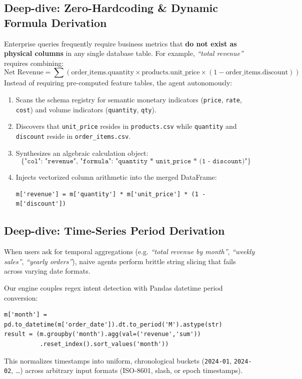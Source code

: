 \documentclass[11pt,a4paper]{article}
\begin{document}
\subsection{Deep-dive: Zero-Hardcoding \& Dynamic Formula Derivation}
Enterprise queries frequently require business metrics that \textbf{do not exist as physical columns} in any single database table. For example, \emph{``total revenue''} requires combining:
$$\text{Net Revenue} = \sum \left( \text{order\_items.quantity} \times \text{products.unit\_price} \times (1 - \text{order\_items.discount}) \right)$$
Instead of requiring pre-computed feature tables, the agent autonomously:
\begin{enumerate}[leftmargin=0.8cm]
\item Scans the schema registry for semantic monetary indicators (\texttt{price}, \texttt{rate}, \texttt{cost}) and volume indicators (\texttt{quantity}, \texttt{qty}).
\item Discovers that \texttt{unit\_price} resides in \texttt{products.csv} while \texttt{quantity} and \texttt{discount} reside in \texttt{order\_items.csv}.
\item Synthesizes an algebraic calculation object:
$$\texttt{\{"col": "revenue", "formula": "quantity * unit\_price * (1 - discount)"\}}$$
\item Injects vectorized column arithmetic into the merged DataFrame:
\begin{verbatim}
m['revenue'] = m['quantity'] * m['unit_price'] * (1 - m['discount'])
\end{verbatim}
\end{enumerate}

\subsection{Deep-dive: Time-Series Period Derivation}
When users ask for temporal aggregations (e.g. \emph{``total revenue by month''}, \emph{``weekly sales''}, \emph{``yearly orders''}), naive agents perform brittle string slicing that fails across varying date formats. 

Our engine couples regex intent detection with Pandas datetime period conversion:
\begin{verbatim}
m['month'] = pd.to_datetime(m['order_date']).dt.to_period('M').astype(str)
result = (m.groupby('month').agg(val=('revenue','sum'))
          .reset_index().sort_values('month'))
\end{verbatim}
This normalizes timestamps into uniform, chronological buckets (\texttt{2024-01}, \texttt{2024-02}, \dots) across arbitrary input formats (ISO-8601, slash, or epoch timestamps).
\end{document}

